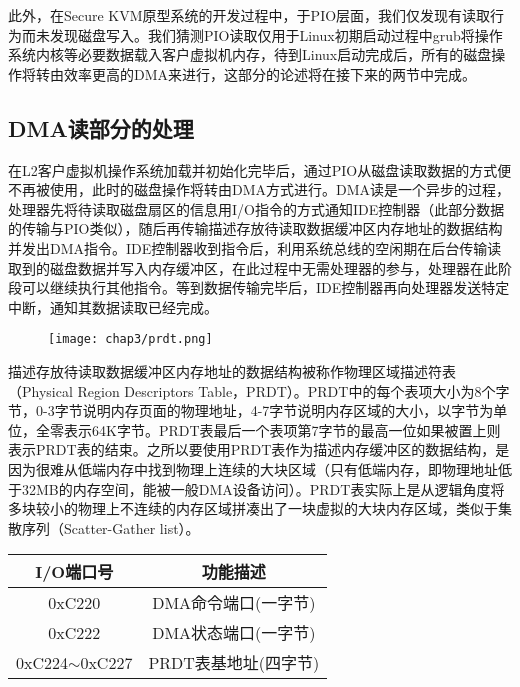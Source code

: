 此外，在Secure KVM原型系统的开发过程中，于PIO层面，我们仅发现有读取行为而未发现磁盘写入。我们猜测PIO读取仅用于Linux初期启动过程中grub\cite{grub}将操作系统内核等必要数据载入客户虚拟机内存，待到Linux启动完成后，所有的磁盘操作将转由效率更高的DMA来进行，这部分的论述将在接下来的两节中完成。

\subsection{DMA读部分的处理}

在L2客户虚拟机操作系统加载并初始化完毕后，通过PIO从磁盘读取数据的方式便不再被使用，此时的磁盘操作将转由DMA方式进行。DMA读是一个异步的过程，处理器先将待读取磁盘扇区的信息用I/O指令的方式通知IDE控制器（此部分数据的传输与PIO类似），随后再传输描述存放待读取数据缓冲区内存地址的数据结构并发出DMA指令。IDE控制器收到指令后，利用系统总线的空闲期在后台传输读取到的磁盘数据并写入内存缓冲区，在此过程中无需处理器的参与，处理器在此阶段可以继续执行其他指令。等到数据传输完毕后，IDE控制器再向处理器发送特定中断，通知其数据读取已经完成。

\begin{figure}[!htbp]
  \centering
  \texttt{[image: chap3/prdt.png]}
\end{figure}

描述存放待读取数据缓冲区内存地址的数据结构被称作物理区域描述符表（Physical Region Descriptors Table，PRDT）。PRDT中的每个表项大小为8个字节，0-3字节说明内存页面的物理地址，4-7字节说明内存区域的大小，以字节为单位，全零表示64K字节。PRDT表最后一个表项第7字节的最高一位如果被置上则表示PRDT表的结束。之所以要使用PRDT表作为描述内存缓冲区的数据结构，是因为很难从低端内存中找到物理上连续的大块区域（只有低端内存，即物理地址低于32MB的内存空间，能被一般DMA设备访问）。PRDT表实际上是从逻辑角度将多块较小的物理上不连续的内存区域拼凑出了一块虚拟的大块内存区域，类似于集散序列（Scatter-Gather list）。

\begin{table}[!htbp]
\centering
\begin{tabular}{cc}
\toprule
I/O端口号	& 功能描述\\
\midrule
0xC220	&DMA命令端口(一字节)\\
0xC222	&DMA状态端口(一字节)\\
0xC224$\sim$0xC227 &PRDT表基地址(四字节)\\
\bottomrule
\end{tabular}
\end{table}

